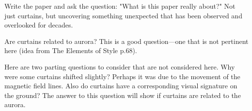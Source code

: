 \documentclass[draft]{agujournal2019}
\begin{document}
Write the paper and ask the question: "What is this paper really about?" Not just curtains, but uncovering something unexpected that has been observed and overlooked for decades.

Are curtains related to aurora? This is a good question---one that is not pertinent here (idea from The Elements of Style p.68).

Here are two parting questions to consider that are not considered here. Why were some curtains shifted slightly? Perhaps it was due to the movement of the magnetic field lines. Also do curtains have a corresponding visual signature on the ground? The answer to this question will show if curtains are related to the aurora.



\end{document}
